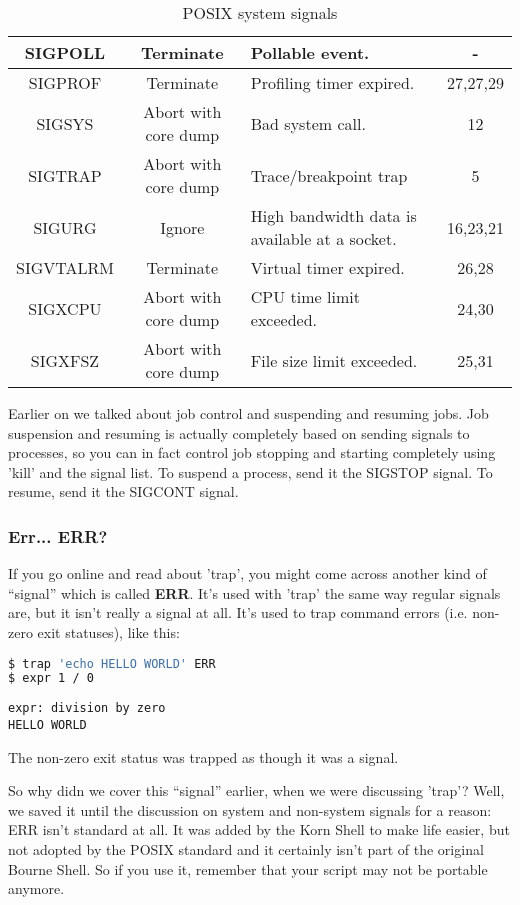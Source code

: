 \begin{table*}[H]
\begin{tabular}{|c|c|p{5cm}|c|}
		 SIGPOLL &  Terminate &  Pollable event. &  - \\ \hline
		 SIGPROF &  Terminate &  Profiling timer expired. &  27,27,29 \\ \hline
		 SIGSYS &  Abort with core dump &  Bad system call. &  12 \\ \hline
		 SIGTRAP &  Abort with core dump &  Trace/breakpoint trap &  5 \\ \hline
		 SIGURG &  Ignore &  High bandwidth data is available at a socket. &  16,23,21 \\ \hline
		 SIGVTALRM &  Terminate &  Virtual timer expired. &  26,28 \\ \hline
		 SIGXCPU &  Abort with core dump &  CPU time limit exceeded. &  24,30 \\ \hline
		 SIGXFSZ &  Abort with core dump &  File size limit exceeded. &  25,31 \\ \hline
	\end{tabular}
	\caption{POSIX system signals}
	\label{tab:posixsignal}
\end{table*}

Earlier on we talked about job control and suspending and resuming jobs. Job
suspension and resuming is actually completely based on sending signals to
processes, so you can in fact control job stopping and starting completely
using 'kill' and the signal list. To suspend a process, send it the SIGSTOP
signal. To resume, send it the SIGCONT signal.

\subsubsection{Err... ERR?}
If you go online and read about 'trap', you might come across another kind of
``signal'' which is called \textbf{ERR}. It's used with 'trap' the same way
regular signals are, but it isn't really a signal at all. It's used to trap
command errors (i.e. non-zero exit statuses), like this:

\lstset{basicstyle=\scriptsize, numbers=left, captionpos=b, tabsize=4}
\begin{lstlisting}[caption=Error trapping,language={bash},
breaklines=true,xleftmargin=15pt,label=lst:Error trapping]
$ trap 'echo HELLO WORLD' ERR
$ expr 1 / 0
\end{lstlisting}

\scriptsize
\begin{verbatim}
expr: division by zero
HELLO WORLD
\end{verbatim}
\normalsize
The non-zero exit status was trapped as though it was a signal.

So why didn we cover this ``signal'' earlier, when we were discussing
'trap'? Well, we saved it until
the discussion on system and non-system signals for a reason: ERR isn't
standard at all. It was added by the Korn Shell to make life easier, but not
adopted by the POSIX standard and it certainly isn't part of the original
Bourne Shell. So if you use it, remember that your script may not be portable
anymore.
